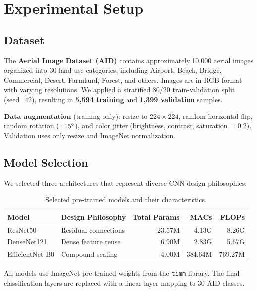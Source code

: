 \documentclass[11pt, a4paper]{article}
\begin{document}
\section{Experimental Setup}

\subsection{Dataset}
The \textbf{Aerial Image Dataset (AID)} contains approximately 10,000 aerial images organized into 30 land-use categories, including Airport, Beach, Bridge, Commercial, Desert, Farmland, Forest, and others. Images are in RGB format with varying resolutions. We applied a stratified 80/20 train-validation split (seed=42), resulting in \textbf{5,594 training} and \textbf{1,399 validation} samples.

\textbf{Data augmentation} (training only): resize to $224 \times 224$, random horizontal flip, random rotation ($\pm 15\degree$), and color jitter (brightness, contrast, saturation = 0.2). Validation uses only resize and ImageNet normalization.

\subsection{Model Selection}
We selected three architectures that represent diverse CNN design philosophies:

\begin{table}[H]
\centering
\caption{Selected pre-trained models and their characteristics.}
\label{tab:models}
\begin{tabular}{llrrr}
\toprule
\textbf{Model} & \textbf{Design Philosophy} & \textbf{Total Params} & \textbf{MACs} & \textbf{FLOPs} \\
\midrule
ResNet50 & Residual connections & 23.57M & 4.13G & 8.26G \\
DenseNet121 & Dense feature reuse & 6.90M & 2.83G & 5.67G \\
EfficientNet-B0 & Compound scaling & 4.00M & 384.64M & 769.27M \\
\bottomrule
\end{tabular}
\end{table}

All models use ImageNet pre-trained weights from the \texttt{timm} library. The final classification layers are replaced with a linear layer mapping to 30 AID classes.
\end{document}
